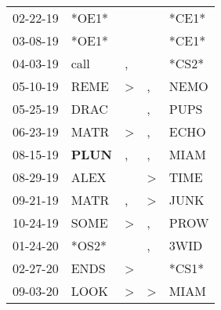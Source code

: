 \begin{supertabular}{p{0.07\textwidth}p{0.06\textwidth}p{0.02\textwidth}p{0.02\textwidth}p{0.06\textwidth}}
          02-22-19\textsuperscript{} &                            *OE1* &                  &                  &                            *CE1* \\
          03-08-19\textsuperscript{} &                            *OE1* &                  &                  &                            *CE1* \\
          04-03-19\textsuperscript{} &           call\textsuperscript{} &                , &                  &                            *CS2* \\
          05-10-19\textsuperscript{} &           REME\textsuperscript{} &     \textgreater &                , &           NEMO\textsuperscript{} \\
          05-25-19\textsuperscript{} &           DRAC\textsuperscript{} &                  &                , &           PUPS\textsuperscript{} \\
          06-23-19\textsuperscript{} &           MATR\textsuperscript{} &     \textgreater &                , &           ECHO\textsuperscript{} \\
          08-15-19\textsuperscript{} &  \textbf{PLUN\textsuperscript{}} &                , &                , &           MIAM\textsuperscript{} \\
          08-29-19\textsuperscript{} &           ALEX\textsuperscript{} &                  &     \textgreater &           TIME\textsuperscript{} \\
          09-21-19\textsuperscript{} &           MATR\textsuperscript{} &                , &     \textgreater &           JUNK\textsuperscript{} \\
          10-24-19\textsuperscript{} &           SOME\textsuperscript{} &     \textgreater &                , &           PROW\textsuperscript{} \\
          01-24-20\textsuperscript{} &                            *OS2* &                  &                , &           3WID\textsuperscript{} \\
          02-27-20\textsuperscript{} &           ENDS\textsuperscript{} &     \textgreater &                  &                            *CS1* \\
          09-03-20\textsuperscript{} &           LOOK\textsuperscript{} &     \textgreater &     \textgreater &           MIAM\textsuperscript{} \\
\end{supertabular}
